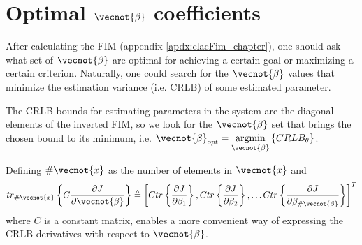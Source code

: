 \chapter{Optimal $\vecnot{\beta}$ coefficients}
\label{apdx:betaOpt}
After calculating the FIM (appendix \ref{apdx:clacFim_chapter}), one should ask what set of $\vecnot{\beta}$ are optimal for achieving a certain goal or maximizing a certain criterion. Naturally, one could search for the $\vecnot{\beta}$ values that minimize the estimation variance (i.e. CRLB) of some estimated parameter.
\par The CRLB bounds for estimating parameters in the system are the diagonal elements of the inverted FIM, so we look for the $\vecnot{\beta}$ set that brings the chosen bound to its minimum, i.e. 
$
\vecnot{\beta}_{opt} = 
\underset{\vecnot{\beta}}{\mathrm{argmin}} 
\left\{
CRLB_{\theta}
\right\}
$.
\par Defining $\#\vecnot{x}$ as the number of elements in $\vecnot{x}$ and $$
tr_{\#\vecnot{x}}
\left\{
C\frac{\partial{J}}{\partial{\vecnot{\beta}}}
\right\} 
\triangleq
\left[
Ctr\left\{\frac{\partial{J}}{\partial{\beta_{1}}}\right\},
Ctr\left\{\frac{\partial{J}}{\partial{\beta_{2}}}\right\},
\hdots
Ctr\left\{\frac{\partial{J}}{\partial{\beta_{\#\vecnot{\beta}}}}\right\}
\right]^{T} $$ where $C$ is a constant matrix, enables a more convenient way of expressing the CRLB derivatives with respect to $\vecnot{\beta}$.
\\  
\ifdefined\showDev
